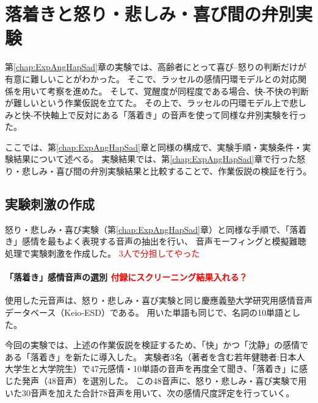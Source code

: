 \newpage
\chapter{落着きと怒り・悲しみ・喜び間の弁別実験}
\label{chap:ExpCalm}
第\ref{chap:ExpAngHapSad}章の実験では、高齢者にとって喜び--怒りの判断だけが有意に難しいことがわかった。
そこで、ラッセルの感情円環モデル\cite{russell1980circumplex}との対応関係を用いて考察を進めた。
そして、覚醒度が同程度である場合、快-不快の判断が難しいという作業仮説を立てた。
その上で、ラッセルの円環モデル上で悲しみと快-不快軸上で反対にある「落着き」の音声を使って同様な弁別実験を行った。

ここでは、第\ref{chap:ExpAngHapSad}章と同様の構成で、実験手順・実験条件・実験結果について述べる。
実験結果では、第\ref{chap:ExpAngHapSad}章で行った怒り・悲しみ・喜び間の弁別実験結果と比較することで、作業仮説の検証を行う。

\section{実験刺激の作成}
怒り・悲しみ・喜び実験（第\ref{chap:ExpAngHapSad}章）と同様な手順で、「落着き」感情を最もよく表現する音声の抽出を行い、
音声モーフィングと模擬難聴処理で実験刺激を作成した。
\textcolor{red}{3人で分担してやった}

\subsubsection{「落着き」感情音声の選別 \textcolor{red}{付録にスクリーニング結果入れる？}}
使用した元音声は、怒り・悲しみ・喜び実験と同じ慶應義塾大学研究用感情音声データベース（Keio-ESD）\cite{keioESD-J}である。
用いた単語も同じで、名詞の10単語とした。

今回の実験では、上述の作業仮説を検証するため、「快」かつ「沈静」の感情である「落着き」を新たに導入した。
実験者3名（著者を含む若年健聴者:日本人大学生と大学院生）で47元感情・10単語の音声を再度全て聞き、「落着き」に感じた発声（48音声）を選別した。
この48音声に、怒り・悲しみ・喜び実験で用いた30音声を加えた合計78音声を用いて、次の感情尺度評定を行っていく。


